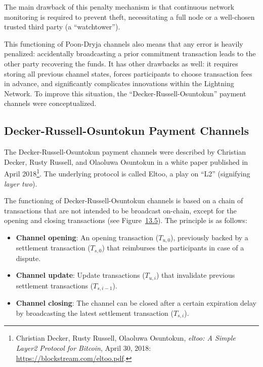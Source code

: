 \documentclass[
  a5paper,
  smalldemyvopaper,10pt,twoside,onecolumn,openright,extrafontsizes,hidelinks]{memoir}
\begin{document}
The main drawback of this penalty mechanism is that continuous network
monitoring is required to prevent theft, necessitating a full node or a
well-chosen trusted third party (a ``watchtower'').

This functioning of Poon-Dryja channels also means that any error is
heavily penalized: accidentally broadcasting a prior commitment
transaction leads to the other party recovering the funds. It has other
drawbacks as well: it requires storing all previous channel states,
forces participants to choose transaction fees in advance, and
significantly complicates innovations within the Lightning Network. To
improve this situation, the ``Decker-Russell-Osuntokun'' payment
channels were conceptualized.

\subsection{Decker-Russell-Osuntokun Payment
Channels}\label{decker-russell-osuntokun-payment-channels}

The Decker-Russell-Osuntokun payment channels were described by
Christian Decker, Rusty Russell, and Olaoluwa Osuntokun in a white paper
published in April 2018\footnote{Christian Decker, Rusty Russell,
  Olaoluwa Osuntokun, \emph{eltoo: A Simple Layer2 Protocol for
  Bitcoin}, April 30, 2018: \url{https://blockstream.com/eltoo.pdf}.}.
The underlying protocol is called Eltoo, a play on ``L2'' (signifying
\emph{layer two}).

The functioning of Decker-Russell-Osuntokun channels is based on a chain
of transactions that are not intended to be broadcast on-chain, except
for the opening and closing transactions (see
Figure~\hyperref[fig:eltoo]{13.5}). The principle is as follows:

\begin{itemize}
\item
  \textbf{Channel opening}: An opening transaction (\(T_{u,0}\)),
  previously backed by a settlement transaction (\(T_{s,0}\)) that
  reimburses the participants in case of a dispute.
\item
  \textbf{Channel update}: Update transactions (\(T_{u,i}\)) that
  invalidate previous settlement transactions (\(T_{s,i-1}\)).
\item
  \textbf{Channel closing}: The channel can be closed after a certain
  expiration delay by broadcasting the latest settlement transaction
  (\(T_{s,i}\)).
\end{itemize}
\end{document}
